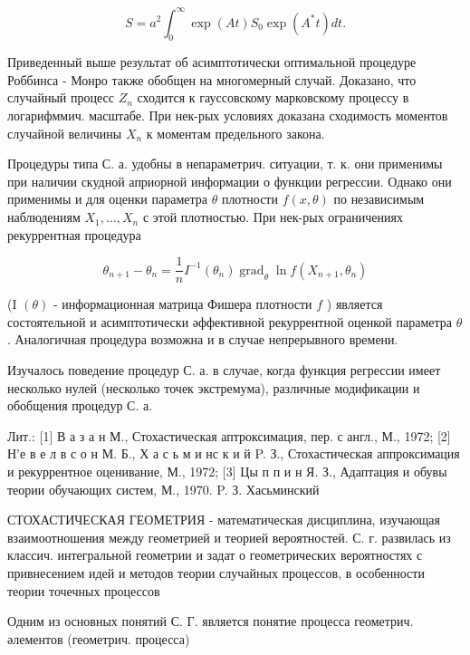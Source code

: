 \documentclass[10pt]{article}
\begin{document}
\[

S=a^{2} \int_{0}^{\infty} \exp (A t) S_{0} \exp \left(A^{*} t\right) d t .

\]



Приведенный выше результат об асимптотически оптимальной процедуре Роббинса - Монро также обобщен на многомерный случай. Доказано, что случайный процесс $Z_{n}$ сходится к гауссовскому марковскому процессу в логарифммич. масштабе. При нек-рых условиях доказана сходимость моментов случайной величины $X_{n}$ к моментам предельного закона.



Процедуры типа С. а. удобны в непараметрич. ситуации, т. к. они применимы при наличии скудной априорной информации о функции регрессии. Однако они применимы и для оценки параметра $\theta$ плотности $f(x, \theta)$ по независимым наблюдениям $X_{1}, \ldots, X_{n}$ с этой плотностью. При нек-рых ограничениях рекуррентная процедура



\[

\theta_{n+1}-\theta_{n}=\frac{1}{n} I^{-1}\left(\theta_{n}\right) \operatorname{grad}_{\theta} \ln f\left(X_{n+1}, \theta_{n}\right)

\]



(I $(\theta)$ - информационная матрица Фишера плотности $f$ ) является состоятельной и асимптотически әффективной рекуррентной оценкой параметра $\theta$. Аналогичная процедура возможна и в случае непрерывного времени.



Изучалось поведение процедур С. а. в случае, когда функция регрессии имеет несколько нулей (несколько точек экстремума), различные модификации и обобщения процедур С. а.



Лит.: [1] В а з а н М., Стохастическая аптроксимация, пер. с англ., М., 1972; [2] Н'е в е л в с о н М. Б., Х а с ь м и нс к и й P. З., Стохастическая аппроксимация и рекуррентное оценивание, М., 1972; [3] Цы п п и н Я. З., Адаптация и обувы теории обучающих систем, М., 1970. P. З. Хасьминский



СТОХАСТИЧЕСКАЯ ГЕОМЕТРИЯ - математическая дисциплина, изучающая взаимоотношения между геометрией и теорией вероятностей. С. г. развилась из классич. интегральной геометрии и задат о геометрических вероятностях с привнесением идей и методов теории случайных процессов, в особенности теории точечных процессов



Одним из основных понятий С. Г. является понятие процесса геометрич. әлементов (геометрич. процесса)
\end{document}
